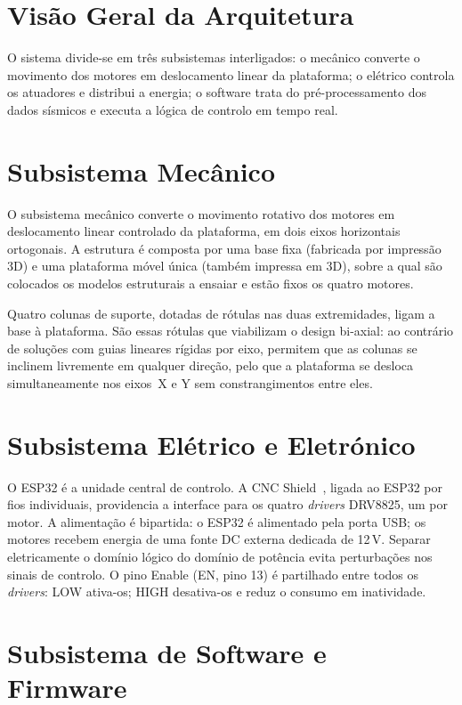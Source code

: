 \section{Visão Geral da Arquitetura}
\label{sec:visao-geral}

O sistema divide-se em três subsistemas interligados: o mecânico converte o movimento dos motores em deslocamento linear da plataforma; o elétrico controla os atuadores e distribui a energia; o software trata do pré-processamento dos dados sísmicos e executa a lógica de controlo em tempo real.

\section{Subsistema Mecânico}
\label{sec:subsistema-mecanico}

O subsistema mecânico converte o movimento rotativo dos motores em deslocamento linear controlado da plataforma, em dois eixos horizontais ortogonais. A estrutura é composta por uma base fixa (fabricada por impressão 3D) e uma plataforma móvel única (também impressa em 3D), sobre a qual são colocados os modelos estruturais a ensaiar e estão fixos os quatro motores.

Quatro colunas de suporte, dotadas de rótulas nas duas extremidades, ligam a base à plataforma. São essas rótulas que viabilizam o design bi-axial: ao contrário de soluções com guias lineares rígidas por eixo, permitem que as colunas se inclinem livremente em qualquer direção, pelo que a plataforma se desloca simultaneamente nos eixos~X e Y sem constrangimentos entre eles.

\section{Subsistema Elétrico e Eletrónico}
\label{sec:subsistema-eletrico}

O ESP32 é a unidade central de controlo. A CNC Shield~\cite{JoyITCNCKit2}, ligada ao ESP32 por fios individuais, providencia a interface para os quatro \textit{drivers} DRV8825, um por motor. A alimentação é bipartida: o ESP32 é alimentado pela porta USB; os motores recebem energia de uma fonte DC externa dedicada de 12\,V. Separar eletricamente o domínio lógico do domínio de potência evita perturbações nos sinais de controlo. O pino Enable (EN, pino 13) é partilhado entre todos os \textit{drivers}: LOW ativa-os; HIGH desativa-os e reduz o consumo em inatividade.

\section{Subsistema de Software e Firmware}
\label{sec:subsistema-software}

